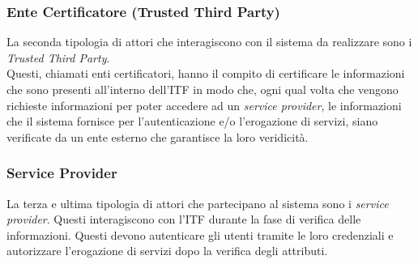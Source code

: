 \subsubsection{Ente Certificatore (Trusted Third Party)}
La seconda tipologia di attori che interagiscono con il sistema da realizzare sono i \textit{Trusted Third Party}.\\
Questi, chiamati enti certificatori, hanno il compito di certificare le informazioni che sono presenti all'interno dell'\gls{ITF} in modo che, ogni qual volta che vengono richieste informazioni per poter accedere ad un \textit{service provider}, le informazioni che il sistema fornisce per l'autenticazione e/o l'erogazione di servizi, siano verificate da un ente esterno che garantisce la loro veridicità.
\subsubsection{Service Provider}
La terza e ultima tipologia di attori che partecipano al sistema sono i \textit{service provider}.
Questi interagiscono con l'\gls{ITF} durante la fase di verifica delle informazioni. Questi devono autenticare gli utenti tramite le loro credenziali e autorizzare l'erogazione di servizi dopo la verifica degli attributi.
